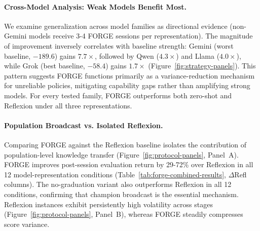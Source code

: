 \documentclass[sigconf]{acmart}
\begin{document}
\paragraph{Cross-Model Analysis: Weak Models Benefit Most.}
We examine generalization across model families as directional evidence (non-Gemini models receive 3-4 FORGE sessions per representation). The magnitude of improvement inversely correlates with baseline strength: Gemini (worst baseline, $-189.6$) gains $7.7\times$, followed by Qwen ($4.3\times$) and Llama ($4.0\times$), while Grok (best baseline, $-58.4$) gains $1.7\times$ (Figure~\ref{fig:strategy-panels}). This pattern suggests FORGE functions primarily as a variance-reduction mechanism for unreliable policies, mitigating capability gaps rather than amplifying strong models. For every tested family, FORGE outperforms both zero-shot and Reflexion under all three representations.

\paragraph{Population Broadcast vs. Isolated Reflexion.}
Comparing FORGE against the Reflexion baseline isolates the contribution of population-level knowledge transfer (Figure~\ref{fig:protocol-panels}, Panel~A). FORGE improves post-session evaluation return by 29-72\% over Reflexion in all 12 model-representation conditions (Table~\ref{tab:forge-combined-results}, $\Delta$Refl columns). The no-graduation variant also outperforms Reflexion in all 12 conditions, confirming that champion broadcast is the essential mechanism. Reflexion instances exhibit persistently high volatility across stages (Figure~\ref{fig:protocol-panels}, Panel~B), whereas FORGE steadily compresses score variance.
\end{document}
